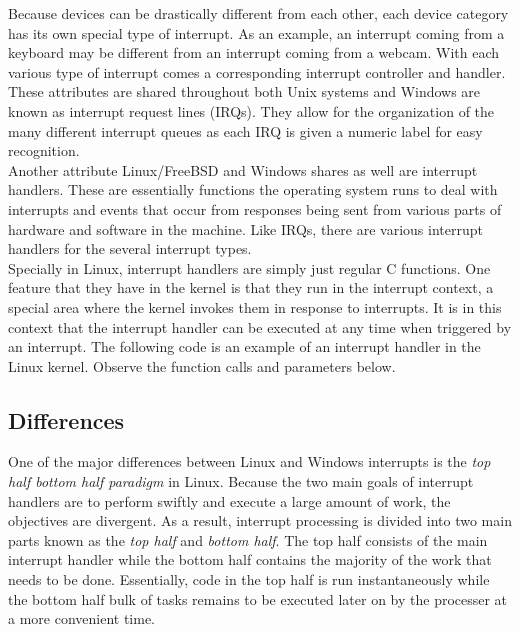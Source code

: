 \documentclass[letterpaper,10pt,titlepage]{article}
\begin{document}
Because devices can be drastically different from each other, each device category has its own special type of interrupt.  As an example, an interrupt coming from a keyboard may be different from an interrupt coming from a webcam.  With each various type of interrupt comes a corresponding interrupt controller and handler.  These attributes are shared throughout both Unix systems and Windows are known as interrupt request lines (IRQs).  They allow for the organization of the many different interrupt queues as each IRQ is given a numeric label for easy recognition.\cite{lkd7}\\

Another attribute Linux/FreeBSD and Windows shares as well are interrupt handlers.  These are essentially functions the operating system runs to deal with interrupts and events that occur from responses being sent from various parts of hardware and software in the machine.  Like IRQs, there are various interrupt handlers for the several interrupt types.\\

Specially in Linux, interrupt handlers are simply just regular C functions.  One feature that they have in the kernel is that they run in the interrupt context, a special area where the kernel invokes them in response to interrupts.\cite{lkd7}  It is in this context that the interrupt handler can be executed at any time when triggered by an interrupt.  The following code is an example of an interrupt handler in the Linux kernel.\cite{lkd7}  Observe the function calls and parameters below.\\



\subsection{Differences}

One of the major differences between Linux and Windows interrupts is the \textit{top half bottom half paradigm} in Linux.  Because the two main goals of interrupt handlers are to perform swiftly and execute a large amount of work, the objectives are divergent.  As a result, interrupt processing is divided into two main parts known as the \textit{top half} and \textit{bottom half}.  The top half consists of the main interrupt handler while the bottom half contains the majority of the work that needs to be done.\cite{lkd7}  Essentially, code in the top half is run instantaneously while the bottom half bulk of tasks remains to be executed later on by the processer at a more convenient time.\\
\end{document}
